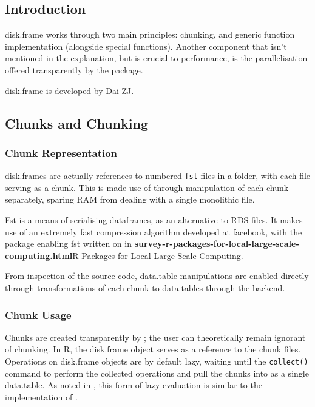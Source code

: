 \subsection{Introduction}\label{sec:disk-frame-introduction}

disk.frame works through two main principles: chunking, and generic
function implementation (alongside special functions). Another component
that isn't mentioned in the explanation, but is crucial to performance,
is the parallelisation offered transparently by the package.

disk.frame is developed by Dai ZJ.

\hypertarget{sec:chunking}{%
    \subsection{Chunks and Chunking}\label{sec:chunking}}

\hypertarget{sec:chunk-representation}{%
    \subsubsection{Chunk Representation}\label{sec:chunk-representation}}

disk.frames are actually references to numbered \texttt{fst} files in a
folder, with each file serving as a chunk. This is made use of through
manipulation of each chunk separately, sparing RAM from dealing with a
single monolithic file\cite{zj19:_inges_data}.

Fst is a means of serialising dataframes, as an alternative to RDS
files\cite{klik19}. It makes use of an extremely fast compression
algorithm developed at facebook, with the \R package enabling fst written
on in \textbf{survey-r-packages-for-local-large-scale-computing.html}{R
    Packages for Local Large-Scale Computing}.

From inspection of the source code, data.table manipulations are enabled
directly through transformations of each chunk to data.tables through
the  backend.

\hypertarget{sec:making-chunks}{%
    \subsubsection{Chunk Usage}\label{sec:making-chunks}}

Chunks are created transparently by ; the user can
theoretically remain ignorant of chunking. In R, the disk.frame object
serves as a reference to the chunk files. Operations on disk.frame
objects are by default lazy, waiting until the
\texttt{collect()} command to perform the
collected operations and pull the chunks into \R as a single data.table.
As noted in \cite{zj19:_simpl_verbs_lazy_evaluat}, this form of lazy
evaluation is similar to the implementation of .

